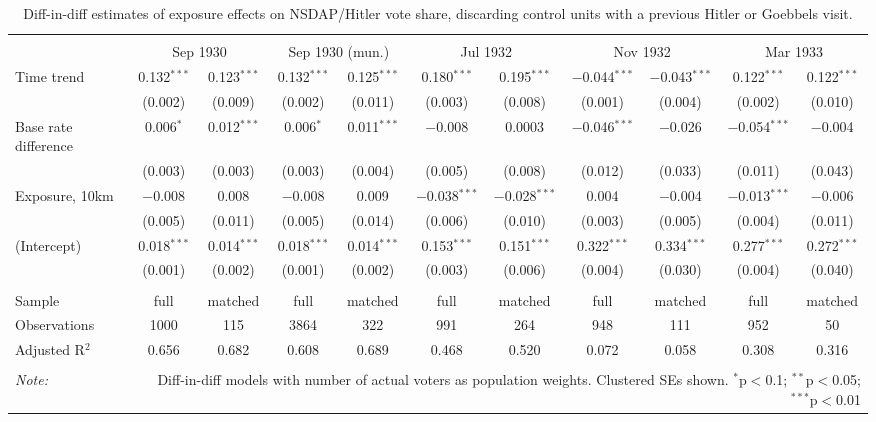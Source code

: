 
\begin{table}[!htbp] \centering 
  \caption{Diff-in-diff estimates of exposure effects on NSDAP/Hitler vote share, discarding control units with a previous Hitler or Goebbels visit.\vspace{-.25cm}} 
  \label{tab:nsdap-voteshare-dd-control-no-prev-visit} 
\scriptsize 
\begin{tabular}{@{\extracolsep{5pt}}lcccccccccc} 
\\[-1.8ex]\hline 
\hline \\[-1.8ex] 
 & \multicolumn{2}{c}{Sep 1930} & \multicolumn{2}{c}{Sep 1930 (mun.)} & \multicolumn{2}{c}{Jul 1932} & \multicolumn{2}{c}{Nov 1932} & \multicolumn{2}{c}{Mar 1933} \\ 
 \cmidrule(r){2-3}\cmidrule(r){4-5}\cmidrule(r){6-7}\cmidrule(r){8-9}\cmidrule(r){10-11}Time trend & 0.132$^{***}$ & 0.123$^{***}$ & 0.132$^{***}$ & 0.125$^{***}$ & 0.180$^{***}$ & 0.195$^{***}$ & $-$0.044$^{***}$ & $-$0.043$^{***}$ & 0.122$^{***}$ & 0.122$^{***}$ \\ 
  & (0.002) & (0.009) & (0.002) & (0.011) & (0.003) & (0.008) & (0.001) & (0.004) & (0.002) & (0.010) \\ 
  Base rate difference & 0.006$^{*}$ & 0.012$^{***}$ & 0.006$^{*}$ & 0.011$^{***}$ & $-$0.008 & 0.0003 & $-$0.046$^{***}$ & $-$0.026 & $-$0.054$^{***}$ & $-$0.004 \\ 
  & (0.003) & (0.003) & (0.003) & (0.004) & (0.005) & (0.008) & (0.012) & (0.033) & (0.011) & (0.043) \\ 
  Exposure, 10km & $-$0.008 & 0.008 & $-$0.008 & 0.009 & $-$0.038$^{***}$ & $-$0.028$^{***}$ & 0.004 & $-$0.004 & $-$0.013$^{***}$ & $-$0.006 \\ 
  & (0.005) & (0.011) & (0.005) & (0.014) & (0.006) & (0.010) & (0.003) & (0.005) & (0.004) & (0.011) \\ 
  (Intercept) & 0.018$^{***}$ & 0.014$^{***}$ & 0.018$^{***}$ & 0.014$^{***}$ & 0.153$^{***}$ & 0.151$^{***}$ & 0.322$^{***}$ & 0.334$^{***}$ & 0.277$^{***}$ & 0.272$^{***}$ \\ 
  & (0.001) & (0.002) & (0.001) & (0.002) & (0.003) & (0.006) & (0.004) & (0.030) & (0.004) & (0.040) \\ 
 \hline \\[-1.8ex] 
Sample & full & matched & full & matched & full & matched & full & matched & full & matched \\ 
Observations & 1000 & 115 & 3864 & 322 & 991 & 264 & 948 & 111 & 952 & 50 \\ 
Adjusted R$^{2}$ & 0.656 & 0.682 & 0.608 & 0.689 & 0.468 & 0.520 & 0.072 & 0.058 & 0.308 & 0.316 \\ 
\hline 
\hline \\[-1.8ex] 
\textit{Note:}  & \multicolumn{10}{r}{Diff-in-diff models with number of actual voters as population weights. Clustered SEs shown. $^{*}$p$<$0.1; $^{**}$p$<$0.05; $^{***}$p$<$0.01} \\ 
\end{tabular} 
\end{table} 
